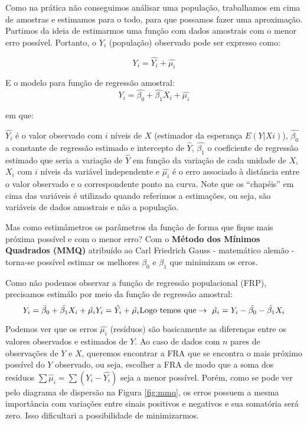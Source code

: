 \documentclass[
]{book}
\begin{document}
Como na prática não conseguimos análisar uma população, trabalhamos em cima de amostras e estimamos para o todo, para que possamos fazer uma aproximação. Partimos da ideia de estimarmos uma função com dados amostrais com o menor erro possível. Portanto, o \(Y_i\) (população) observado pode ser expresso como:

\begin{equation}
    Y_i=\hat{Y_i}+\hat{\mu_i}
    \label{eq:frp}
\end{equation}

E o modelo para função de regressão amostral:
\begin{equation}
    Y_i=\hat{\beta_0}+\hat{\beta_1}X_i+\hat{\mu_i}
    \label{eq:fra}
\end{equation}

em que:

\(\hat{Y_i}\) é o valor observado com \(i\) níveis de \(X\) (estimador da esperança \(E(Y|Xi)\)), \(\hat{\beta_0}\) a constante de regressão estimado e intercepto de \(\hat{Y}\), \(\hat{\beta_1}\) o coeficiente de regressão estimado que seria a variação de \(\hat{Y}\) em função da variação de cada unidade de \(X\), \(X_i\) com \(i\) níveis da variável independente e \(\hat{\mu_i}\) é o erro associado à distância entre o valor observado e o correspondente ponto na curva. Note que os ``chapéis'' em cima das variáveis é utilizado quando referimos a estimações, ou seja, são variáveis de dados amostrais e não a população.

Mas como estimâmetros os parâmetros da função de forma que fique mais próxima possível e com o menor erro? Com o \textbf{Método dos Mínimos Quadrados (MMQ)} atribuído ao Carl Friedrich Gauss - matemático alemão - torna-se possível estimar os melhores \(\beta_0\) e \(\beta_1\) que minimizam os erros.

Como não podemos observar a função de regressão populacional (FRP), precisamos estimálo por meio da função de regressão amostral:
\[Y_i=\hat{\beta_0}+\hat{\beta_1}X_i+\hat{\mu_i} \\ Y_i=\hat{Y_i}+\hat{\mu_i}
\\ \mbox{Logo temos que} \rightarrow \ \hat{\mu_i}=Y_i-\hat{\beta_0}-\hat{\beta_1} X_i\]

Podemos ver que os erros \(\hat{\mu_i}\) (resíduos) são basicamente as diferenças entre os valores observados e estimados de \(Y\). Ao caso de dados com \(n\) pares de observações de \(Y\) e \(X\), queremos encontrar a FRA que se encontra o mais próximo possível do \(Y\) observado, ou seja, escolher a
FRA de modo que a soma dos resíduos \(\sum \hat{\mu}_i=\sum(Y_i-\hat{Y_i})\) seja a menor possível. Porém, como se pode ver pelo diagrama de dispersão na Figura \ref{fig:mmq}, os erros possuem a mesma importância com variações entre sinais positivos e negativos e sua somatória será zero. Isso dificultari a possibilidade de minimizarmos.
\end{document}
